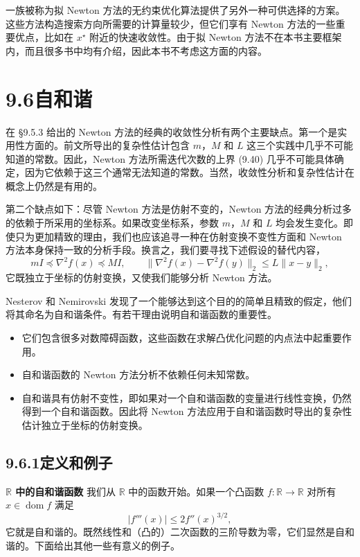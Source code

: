 \documentclass[UTF8, 12pt, fontset=fandol, oneside]{ctexart}
\begin{document}
一族被称为拟 Newton 方法的无约束优化算法提供了另外一种可供选择的方案。这些方法构造搜索方向所需要的计算量较少，但它们享有 Newton 方法的一些重要优点，比如在 $x^\star$ 附近的快速收敛性。由于拟 Newton 方法不在本书主要框架内，而且很多书中均有介绍，因此本书不考虑这方面的内容。

\section*{9.6\quad 自和谐}

在 \S9.5.3 给出的 Newton 方法的经典的收敛性分析有两个主要缺点。第一个是实用性方面的。前文所导出的复杂性估计包含 $m$，$M$ 和 $L$ 这三个实践中几乎不可能知道的常数。因此，Newton 方法所需迭代次数的上界 (9.40) 几乎不可能具体确定，因为它依赖于这三个通常无法知道的常数。当然，收敛性分析和复杂性估计在概念上仍然是有用的。

第二个缺点如下：尽管 Newton 方法是仿射不变的，Newton 方法的经典分析过多的依赖于所采用的坐标系。如果改变坐标系，参数 $m$，$M$ 和 $L$ 均会发生变化。即使只为更加精致的理由，我们也应该追寻一种在仿射变换不变性方面和 Newton 方法本身保持一致的分析手段。换言之，我们要寻找下述假设的替代内容，
\[
mI\preceq\nabla^2f(x)\preceq MI,\qquad
\|\nabla^2f(x)-\nabla^2f(y)\|_2\leq L\|x-y\|_2,
\]
它既独立于坐标的仿射变换，又使我们能够分析 Newton 方法。

Nesterov 和 Nemirovski 发现了一个能够达到这个目的的简单且精致的假定，他们将其命名为自和谐条件。有若干理由说明自和谐函数的重要性。
\begin{itemize}
\item 它们包含很多对数障碍函数，这些函数在求解凸优化问题的内点法中起重要作用。
\item 自和谐函数的 Newton 方法分析不依赖任何未知常数。
\item 自和谐具有仿射不变性，即如果对一个自和谐函数的变量进行线性变换，仍然得到一个自和谐函数。因此将 Newton 方法应用于自和谐函数时导出的复杂性估计独立于坐标的仿射变换。
\end{itemize}

\subsection*{9.6.1\quad 定义和例子}

\noindent\textbf{$\mathbb{R}$ 中的自和谐函数}\quad
我们从 $\mathbb{R}$ 中的函数开始。如果一个凸函数 $f:\mathbb{R}\to\mathbb{R}$ 对所有 $x\in\operatorname{dom} f$ 满足
\begin{equation}
|f'''(x)|\leq2f''(x)^{3/2},
\tag{9.41}
\end{equation}
它就是自和谐的。既然线性和（凸的）二次函数的三阶导数为零，它们显然是自和谐的。下面给出其他一些有意义的例子。
\end{document}
